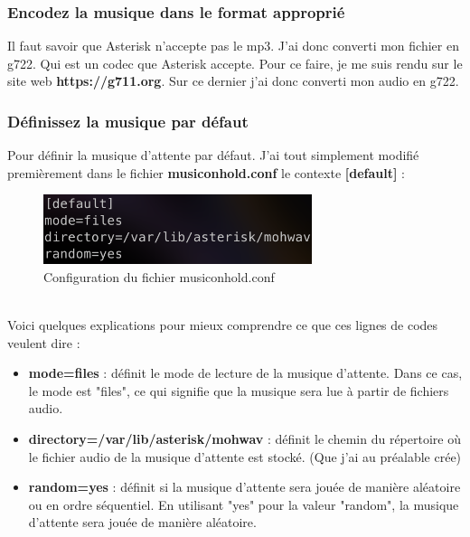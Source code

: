 \documentclass[12pt, a4paper]{article}
\begin{document}
	\subsubsection{Encodez la musique dans le format approprié}
	Il faut savoir que Asterisk n'accepte pas le mp3. J'ai donc converti mon fichier
	en g722. Qui est un codec que Asterisk accepte.
	Pour ce faire, je me suis rendu sur le site web \textbf{https://g711.org}.
	Sur ce dernier j'ai donc converti mon audio en g722.\\

	\subsubsection*{Définissez la musique par défaut}
	Pour définir la musique d'attente par défaut. J'ai tout simplement
	modifié premièrement dans le fichier \textbf{musiconhold.conf} le contexte 
	\textbf{[default]} :
	\begin{figure}[h]
		\centering
		\includegraphics[width=0.7\textwidth]{img/music.png}
		\caption{Configuration du fichier musiconhold.conf}
		\label{fig:mch}
	\end{figure}\\
	Voici quelques explications pour mieux comprendre ce que ces lignes de 
	codes veulent dire :\\
	\begin{itemize}
		\item \textbf{mode=files} : définit le mode de lecture de la musique d'attente. Dans ce cas, le mode est "files", ce qui signifie que la musique sera lue à partir de fichiers audio.\\
		\item \textbf{directory=/var/lib/asterisk/mohwav} : définit le chemin du répertoire où le fichier audio de la musique d'attente est stocké. (Que j'ai au préalable crée)\\
		\item \textbf{random=yes} : définit si la musique d'attente sera jouée de manière aléatoire ou en ordre séquentiel. En utilisant "yes" pour la valeur "random", la musique d'attente sera jouée de manière aléatoire.
	\end{itemize}

	\newpage
\end{document}
